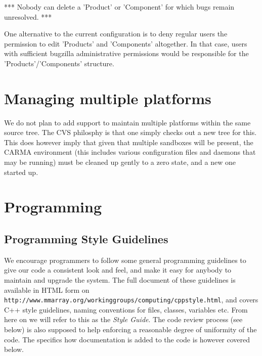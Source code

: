 \documentclass{article}
\begin{document}
*** Nobody can delete a 'Product' or 'Component' for which bugs 
remain unresolved. ***

One alternative to the current configuration is to deny regular users 
the permission to edit 'Products' and 'Components' altogether.  In that 
case, users with sufficient bugzilla administrative permissions would 
be responsible for the 'Products'/'Components' structure.  



\section{Managing multiple platforms}

We do not plan to add support to maintain multiple platforms
within the same source tree. The CVS philosphy is that one simply
checks out a new tree for this. This does however imply that given
that multiple sandboxes will be present, the CARMA environment
(this includes various configuration files and daemons that may be
running) must be cleaned up gently to a zero state, and a new
one started up.



\section{Programming}

\subsection{Programming Style Guidelines}

We encourage programmers to follow some general programming 
guidelines to give our code a consistent look and feel, and
make it easy for anybody to maintain and upgrade the system.
The full document of these guidelines is available in HTML form on\newline
{\tt http://www.mmarray.org/workinggroups/computing/cppstyle.html}, \newline
and covers
C++ style guidelines, naming conventions for files, classes, variables etc.
From here on we will refer to this as the {\it Style Guide}.
The code review process (see below) is also supposed to help enforcing
a reasonable degree of uniformity of the code.
The specifics how documentation is added to the code is however
covered below.
\end{document}
